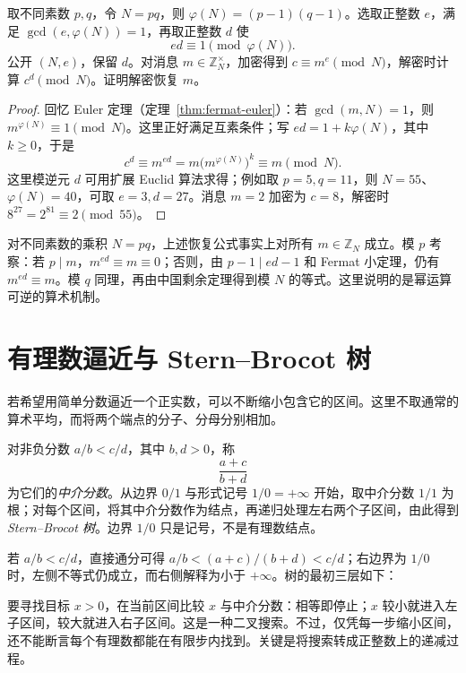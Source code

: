 \documentclass[lang=cn,a4paper,fontset=none,zihao=false,10pt,openany,twoside]{beautybook}
\numberwithin{algorithm}{chapter}
\begin{document}
\begin{example}
取不同素数 $p,q$，令 $N=pq$，则 $\varphi(N)=(p-1)(q-1)$。选取正整数 $e$，满足 $\gcd(e,\varphi(N))=1$，再取正整数 $d$ 使
\[
 ed\equiv1\pmod{\varphi(N)}.
\]
公开 $(N,e)$，保留 $d$。对消息 $m\in\mathbb Z_N^\times$，加密得到 $c\equiv m^e\pmod N$，解密时计算 $c^d\pmod N$。证明解密恢复 $m$。
\end{example}
\begin{proof}
回忆 Euler 定理（定理~\ref{thm:fermat-euler}）：若 $\gcd(m,N)=1$，则 $m^{\varphi(N)}\equiv1\pmod N$。这里正好满足互素条件；写 $ed=1+k\varphi(N)$，其中 $k\ge0$，于是
\[
 c^d\equiv m^{ed}
 =m\bigl(m^{\varphi(N)}\bigr)^k
 \equiv m\pmod N.
\]
这里模逆元 $d$ 可用扩展 Euclid 算法求得；例如取 $p=5,q=11$，则 $N=55$、$\varphi(N)=40$，可取 $e=3,d=27$。消息 $m=2$ 加密为 $c=8$，解密时 $8^{27}=2^{81}\equiv2\pmod{55}$。
\end{proof}
\begin{remark}
对不同素数的乘积 $N=pq$，上述恢复公式事实上对所有 $m\in\mathbb Z_N$ 成立。模 $p$ 考察：若 $p\mid m$，$m^{ed}\equiv m\equiv0$；否则，由 $p-1\mid ed-1$ 和 Fermat 小定理，仍有 $m^{ed}\equiv m$。模 $q$ 同理，再由中国剩余定理得到模 $N$ 的等式。这里说明的是幂运算可逆的算术机制。
\end{remark}

\section{有理数逼近与 Stern--Brocot 树}\label{sec:stern-brocot}
若希望用简单分数逼近一个正实数，可以不断缩小包含它的区间。这里不取通常的算术平均，而将两个端点的分子、分母分别相加。
\begin{definition}
对非负分数 $a/b<c/d$，其中 $b,d>0$，称
\[
 \frac{a+c}{b+d}
\]
为它们的\emph{中介分数}。从边界 $0/1$ 与形式记号 $1/0=+\infty$ 开始，取中介分数 $1/1$ 为根；对每个区间，将其中介分数作为结点，再递归处理左右两个子区间，由此得到 \emph{Stern--Brocot 树}。边界 $1/0$ 只是记号，不是有理数结点。
\end{definition}
若 $a/b<c/d$，直接通分可得 $a/b<(a+c)/(b+d)<c/d$；右边界为 $1/0$ 时，左侧不等式仍成立，而右侧解释为小于 $+\infty$。树的最初三层如下：
\begin{center}
\end{center}
要寻找目标 $x>0$，在当前区间比较 $x$ 与中介分数：相等即停止；$x$ 较小就进入左子区间，较大就进入右子区间。这是一种二叉搜索。不过，仅凭每一步缩小区间，还不能断言每个有理数都能在有限步内找到。关键是将搜索转成正整数上的递减过程。
\end{document}
